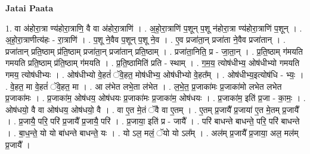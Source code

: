 \documentclass[17pt]{extarticle}
\begin{document}
\textbf{Jatai Paata} \newline

1. वा अ॑होरा॒त्रा ण्य॑होरा॒त्राणि॒ वै वा अ॑होरा॒त्राणि॑ । . अ॒हो॒रा॒त्राणि॑ प॒शून् प॒शू न॑होरा॒त्रा ण्य॑होरा॒त्राणि॑ प॒शून् । . अ॒हो॒रा॒त्राणीत्य॑हः - रा॒त्राणि॑ । . प॒शू ने॒वैव प॒शून् प॒शू ने॒व । . ए॒व प्रजा॑ता॒न् प्रजा॑ता ने॒वैव प्रजा॑तान् । . प्रजा॑तान् प्रति॒ष्ठाम् प्र॑ति॒ष्ठाम् प्रजा॑ता॒न् प्रजा॑तान् प्रति॒ष्ठाम् । . प्रजा॑ता॒निति॒ प्र - जा॒ता॒न् । . प्र॒ति॒ष्ठाम् ग॑मयति गमयति प्रति॒ष्ठाम् प्र॑ति॒ष्ठाम् ग॑मयति । . प्र॒ति॒ष्ठामिति॑ प्रति - स्थाम् । . ग॒म॒य॒ त्योष॑धीभ्य॒ ओष॑धीभ्यो गमयति गमय॒ त्योष॑धीभ्यः । . ओष॑धीभ्यो वे॒हतं॑ ॅवे॒हत॒ मोष॑धीभ्य॒ ओष॑धीभ्यो वे॒हत᳚म् । . ओष॑धीभ्य॒इत्योष॑धि - भ्यः॒ । . वे॒हत॒ मा वे॒हतं॑ ॅवे॒हत॒ मा । . आ ल॑भेत लभे॒ता ल॑भेत । . ल॒भे॒त॒ प्र॒जाका॑मः प्र॒जाका॑मो लभेत लभेत प्र॒जाका॑मः । . प्र॒जाका॑म॒ ओष॑धय॒ ओष॑धयः प्र॒जाका॑मः प्र॒जाका॑म॒ ओष॑धयः । . प्र॒जाका॑म॒ इति॑ प्र॒जा - का॒मः॒ । . ओष॑धयो॒ वै वा ओष॑धय॒ ओष॑धयो॒ वै । . वा ए॒त मे॒तं ॅवै वा ए॒तम् । . ए॒तम् प्र॒जायै᳚ प्र॒जाया॑ ए॒त मे॒तम् प्र॒जायै᳚ । . प्र॒जायै॒ परि॒ परि॑ प्र॒जायै᳚ प्र॒जायै॒ परि॑ । . प्र॒जाया॒ इति॑ प्र - जायै᳚ । . परि॑ बाधन्ते बाधन्ते॒ परि॒ परि॑ बाधन्ते । . बा॒ध॒न्ते॒ यो यो बा॑धन्ते बाधन्ते॒ यः । . यो ऽल॒ मलं॒ ॅयो यो ऽल᳚म् । . अल॑म् प्र॒जायै᳚ प्र॒जाया॒ अल॒ मल॑म् प्र॒जायै᳚ । \newline
\end{document}
